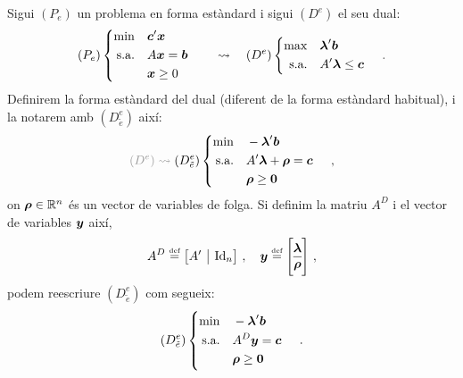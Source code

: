 \begin{defi*}\label{defi:std-dual}
	Sigui $(P_e)$ un problema en forma estàndard i sigui $(D^e)$ el seu dual:
	\[
		(P_e)
		\begin{cases}
		\begin{aligned}
		\min 			&&& \boldsymbol{c}'\boldsymbol{x}\\
		\text{s.a.}		&&& A\boldsymbol{x} = \boldsymbol{b}\\
		&&& \boldsymbol{x}\ge0
		\end{aligned}
		\end{cases}\quad\rightsquigarrow\quad
		(D^e)
		\begin{cases}
		\begin{aligned}
		\max 			&&& \boldsymbol{\lambda}'\boldsymbol{b}\\
		\text{s.a.}		&&& A'\boldsymbol{\lambda} \le \boldsymbol{c}
		\end{aligned}
		\end{cases}\,.
	\]
	Definirem la forma estàndard del dual (diferent de la forma estàndard habitual), i la notarem amb $(D^e_{\tilde{e}})$ així:
	\[
		{\color[gray]{0.6}(D^e)\rightsquigarrow\;}(D^e_{\tilde{e}})
		\begin{cases}
		\begin{aligned}
		\min 			&&& -\vb{\lambda}'\vb{b}\\
		\text{s.a.}		&&& A'\vb{\lambda} +  \vb{\rho} = \vb{c}\\
						&&& \vb{\rho} \ge \vb{0}
		\end{aligned}
		\end{cases}\,,
	\]
	on $\boldsymbol{\rho} \in \mathbb{R}^n$ és un vector de variables de folga. Si definim la matriu $A^D$ i el vector de variables $\boldsymbol{y}$ així, 
	\[
		A^D\defeq 
		\left[\begin{array}{{@{}c|c@{}}}
			A' & \Id_n
		\end{array}\right]\,, \quad
		\vb{y} \defeq
		\left[\begin{array}{@{}c@{}}
			\vb{\lambda}\\
			\hline
			\vb{\rho}
		\end{array}\right]\,,
	\]
	podem reescriure $(D^e_{\tilde{e}})$ com segueix:
	\[
		(D^e_{\tilde{e}})
		\begin{cases}
		\begin{aligned}
			\min 			&&& -\boldsymbol{\lambda}'\boldsymbol{b}\\
			\text{s.a.}		&&& A^D\boldsymbol{y} = \boldsymbol{c}\\
			&&& \boldsymbol{\rho} \ge \boldsymbol{0}
		\end{aligned}
		\end{cases}\,.
	\]
\end{defi*}

